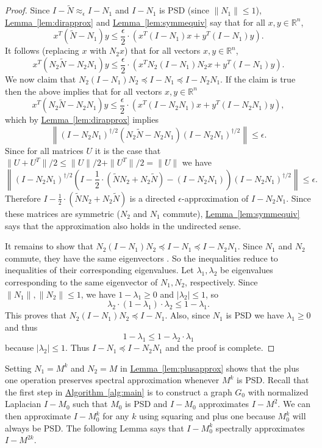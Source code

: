\documentclass[11pt]{article}
\numberwithin{equation}{section}
\theoremstyle{definition}
\theoremstyle{plain}
\newcommand{\expref}[2]{\hyperref[#2]{#1~\ref{#2}}}
\newcommand{\wt}{\widetilde}   %
\numberwithin{myalgctr}{section}
\theoremstyle{named}
\begin{document}
\begin{proof}
Since $I-\wt{N}\approx_{\epsilon} I-N_1$ and $I-N_1$ is PSD (since $\|N_1\|\leq 1$), \expref{Lemma}{lem:dirapprox} and \expref{Lemma}{lem:symmequiv} say that for all $x,y\in \mathbb{R}^n$,
 \[
x^T(\wt{N}-N_1)y\leq \frac{\epsilon}{2}\cdot (x^T(I-N_1)x +y^T(I-N_1)y).
\]
It follows (replacing $x$ with $N_2x$) that for all vectors $x,y\in \mathbb{R}^n$,
 \[
x^T(N_2\wt{N}-N_2N_1)y\leq \frac{\epsilon}{2}\cdot (x^TN_2(I-N_1)N_2x +y^T(I-N_1)y).
\]
We now claim that $N_2(I-N_1)N_2\preceq I-N_1\preceq I - N_2N_1$. If the claim is true then the above implies that for all vectors $x,y\in \mathbb{R}^n$
 \[
x^T(N_2\wt{N}-N_2N_1)y\leq \frac{\epsilon}{2}\cdot (x^T(I-N_2N_1)x +y^T(I-N_2N_1)y),
\]
which by \expref{Lemma}{lem:dirapprox} implies 
\[
\left\|(I-N_2N_1)^{\dagger/2}(N_2\wt{N}-N_2N_1)(I-N_2N_1)^{\dagger/2}\right\| \leq \epsilon.
\]
Since for all matrices $U$ it is the case that $\|U+U^T\|/2\leq \|U\|/2 +\|U^T\|/2 =\|U\|$ we have
\[
\left\|(I-N_2N_1)^{\dagger/2}\left(I-\frac{1}{2}\cdot(\wt{N}N_2 + N_2\wt{N})-(I-N_2N_1)\right)(I-N_2N_1)^{\dagger/2}\right\| \leq \epsilon.
\]
Therefore $I-\frac{1}{2}\cdot(\wt{N}N_2 + N_2\wt{N})$ is a directed $\epsilon$-approximation of $I-N_2N_1$. Since these matrices are symmetric ($N_2$ and $N_1$ commute), \expref{Lemma}{lem:symmequiv} says that the approximation also holds in the undirected sense. 

It remains to show that $N_2(I-N_1)N_2\preceq I-N_1\preceq I - N_2N_1$. Since $N_1$ and $N_2$ commute, they have the same eigenvectors \cite{horn1990matrix}. So the inequalities reduce to inequalities of their corresponding eigenvalues. Let $\lambda_1,\lambda_2$  be eigenvalues corresponding to the same eigenvector of $N_1,N_2$, respectively. Since $\|N_1\|,\|N_2\|\leq 1$, we have $1-\lambda_1\geq 0$ and $|\lambda_2|\leq 1$, so 
\[
\lambda_2\cdot(1-\lambda_1)\cdot\lambda_2\leq 1-\lambda_1.
\]
This proves that $N_2(I-N_1)N_2\preceq I-N_1$. Also, since $N_1$ is PSD we have $\lambda_1\geq 0$ and thus
\[
1-\lambda_1 \leq 1-\lambda_2\cdot\lambda_1
\]
because $|\lambda_2|\leq 1$. Thus $I-N_1\preceq I-N_2N_1$ and the proof is complete.
\end{proof}
Setting $N_1=M^k$ and $N_2=M$ in \expref{Lemma}{lem:plusapprox} shows that the plus one operation preserves spectral approximation whenever $M^k$ is PSD. Recall that the first step in \expref{Algorithm}{alg:main} is to construct a graph $G_0$ with normalized Laplacian $I-M_0$ such that $M_0$ is PSD and $I-M_0$ approximates $I-M^2$. We can then approximate $I-M_0^{k}$ for any $k$ using squaring and plus one because $M_0^k$ will always be PSD. The following Lemma says that $I-M_0^k$ spectrally approximates $I-M^{2k}$.
\end{document}
